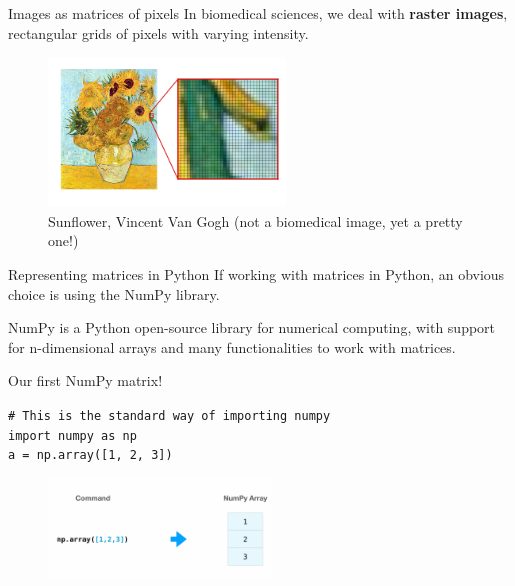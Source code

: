 \documentclass[9pt, aspectratio=169]{beamer}
\begin{document}
\begin{frame}
	{Images as matrices of pixels}
	In biomedical sciences, we deal with \textbf{raster images}, rectangular grids of pixels with varying intensity.

	\begin{figure}
		\centering
		\includegraphics[height=150px]{vangoghzoom.png}
		\caption{Sunflower, Vincent Van Gogh (not a biomedical image, yet a pretty one!)}
	\end{figure}
\end{frame}

\begin{frame}
	{Representing matrices in Python}
	If working with matrices in Python, an obvious choice is using the NumPy library.

	NumPy is a Python open-source library for numerical computing, with support for n-dimensional arrays and many functionalities to work with matrices.
\end{frame}

\begin{frame}
	{Our first NumPy matrix!}

	\begin{codebox}
		\texttt{\# This is the standard way of importing numpy\\
			import numpy as np\\
			a = np.array([1, 2, 3])
		}
	\end{codebox}

	\begin{figure}
		\centering
		\includegraphics[height=100px]{np_array.png}
	\end{figure}
\end{frame}
\end{document}
